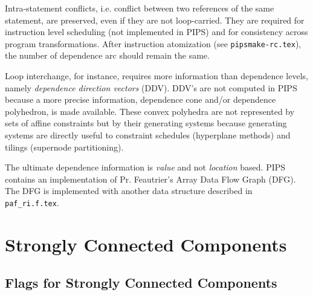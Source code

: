 \documentclass[a4paper]{article}
\begin{document}
Intra-statement conflicts, i.e. conflict between two references of the
same statement, are preserved, even if they are not loop-carried. They
are required for instruction level scheduling (not implemented in PIPS)
and for consistency across program transformations. After instruction
atomization (see \verb/pipsmake-rc.tex/), the number of dependence arc
should remain the same.

Loop interchange, for instance, requires more information than
dependence levels, namely {\em dependence direction vectors}
(DDV). DDV's are not computed in PIPS because a more precise
information, dependence cone and/or dependence polyhedron, is made
available. These convex polyhedra are not represented by sets of affine
constraints but by their generating systems because generating systems
are directly useful to constraint schedules (hyperplane methods) and
tilings (supernode partitioning).

The ultimate dependence information is {\em value} and not {\em
location} based. PIPS contains an implementation of Pr. Feautrier's
Array Data Flow Graph (DFG). The DFG is implemented with another data
structure described in \verb/paf_ri.f.tex/.

\begin{comment}
Le domaine co^ne de'finit une approximation polye'drique de l'ensemble
des de'pendances porte'es par un arc. Plusieurs types d'approximation
sont possibles: les niveaux de de'pendance, les vecteurs de direction de
de'pendance, les syste`mes ge'ne'rateurs (aussi
connus sous le nom de {\em co^ne de de'pendance}) et le me'canisme
du {\em Data Flow Graph} n'est pas imple'mente' avec cette structure
de donne'es mais avec \verb|paf_ri|.
\end{comment}

\begin{comment}
Le niveau d'une de'pendance d\'ecrivent le nombre de boucles englobantes
concerne\'ees.  ``{generating\_system}'' est la r\'epresentation de
system generateur.
\end{comment}

\section{Strongly Connected Components}
\label{section-strongly-connected-components}

\subsection{Flags for Strongly Connected Components}
\end{document}
